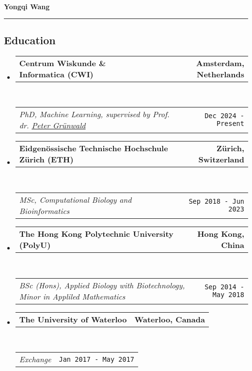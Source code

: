 \documentclass[10pt,a4paper]{article}
\makeatletter
\newcommand{\headerrow}[2]
{\begin{tabular*}{\linewidth}{l@{\extracolsep{\fill}}r}
	#1 &
	#2 \\
\end{tabular*}}
\newcommand{\urlPeter}{https://safestatistics.com/}
\makeatother
\begin{document}

\begin{center}
	{\LARGE \textbf{Yongqi Wang}}
\end{center}


\hrule
\vspace{-1em}
\subsection*{Education}

\begin{itemize}
	\parskip=0.1em

	\item
	      \headerrow
	      {\textbf{Centrum Wiskunde \& Informatica (CWI)}}
	      {\textbf{Amsterdam, Netherlands}}
	      \\
	      \headerrow
	      {\emph{PhD, Machine Learning, supervised by Prof. dr.
			      \href{\urlPeter}{Peter Grünwald}}}
	      {\texttt{Dec 2024 - Present}}

	\item
	      \headerrow
	      {\textbf{Eidgenössische Technische Hochschule Zürich (ETH)}}
	      {\textbf{Zürich, Switzerland}}
	      \\
	      \headerrow
	      {\emph{MSc, Computational Biology and Bioinformatics}}
	      {\texttt{Sep 2018 - Jun 2023}}

	\item
	      \headerrow
	      {\textbf{The Hong Kong Polytechnic University (PolyU)}}
	      {\textbf{Hong Kong, China}}
	      \\
	      \headerrow
	      {\emph{BSc (Hons), Applied Biology with Biotechnology,
			      Minor in Appliled Mathematics}}
	      {\texttt{Sep 2014 - May 2018}}

	\item
	      \headerrow
	      {\textbf{The University of Waterloo}}
	      {\textbf{Waterloo, Canada}}
	      \\
	      \headerrow
	      {\emph{Exchange}}
	      {\texttt{Jan 2017 - May 2017}}

\end{itemize}
\end{document}

